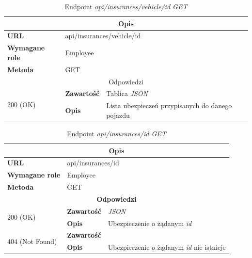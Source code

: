 \documentclass[eng,printmode,openany]{mgr}
\begin{document}
	\begin{table}[H]
		\caption{Endpoint \textit{api/insurances/vehicle/id GET}}
		\begin{tabularx}{\textwidth}{|l|l|X|}
			\hline
			\multicolumn{3}{|c|}{\textbf{\textbf{Opis}}}
			\\ \hline
			\textbf{URL}                         & \multicolumn{2}{l|}{api/insurances/vehicle/id}
			\\ \hline
			\textbf{Wymagane role}               & \multicolumn{2}{l|}{Employee}
			\\ \hline
			\textbf{Metoda}                      & \multicolumn{2}{l|}{GET}
			\\ \hline
			\multicolumn{3}{|c|}{ Odpowiedzi}
			\\ \hline
			\multirow{2}{*}{200 (OK)}   & \textbf{Zawartość}         & Tablica \textit{JSON}
			\\ \cline{2-3}              & \textbf{Opis}         	    & Lista ubezpieczeń przypisanych do danego pojazdu
			\\ \hline
		\end{tabularx}
	\end{table}
	
	\begin{table}[H]
		\caption{Endpoint \textit{api/insurances/id GET}}
		\begin{tabularx}{\textwidth}{|l|l|X|}
			\hline
			\multicolumn{3}{|c|}{\textbf{\textbf{Opis}}}
			\\ \hline
			\textbf{URL}                         & \multicolumn{2}{l|}{api/insurances/id}
			\\ \hline
			\textbf{Wymagane role}               & \multicolumn{2}{l|}{Employee}
			\\ \hline
			\textbf{Metoda}                      & \multicolumn{2}{l|}{GET}
			\\ \hline
			\multicolumn{3}{|c|}{\textbf{Odpowiedzi}}
			\\ \hline
			\multirow{2}{*}{200 (OK)} 	        & \textbf{Zawartość}   	& \textit{JSON}
			\\ \cline{2-3}                      & \textbf{Opis}         	& Ubezpieczenie o żądanym \textit{id}
			\\ \hline
			\multirow{2}{*}{404 (Not Found)} 	& \textbf{Zawartość}     & 
			\\ \cline{2-3}                      & \textbf{Opis}          & Ubezpieczenie o żądanym \textit{id} nie istnieje
			\\ \hline
		\end{tabularx}
	\end{table}
	
\end{document}

